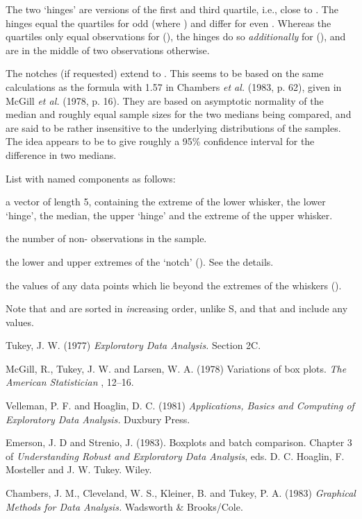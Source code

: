 %
\begin{Details}\relax
The two `hinges' are versions of the first and third quartile,
i.e., close to .  The hinges equal
the quartiles for odd  (where ) and
differ for even .  Whereas the quartiles only equal observations
for  (),
the hinges do so \emph{additionally} for 
(), and are in the middle of
two observations otherwise.

The notches (if requested) extend to .
This seems to be based on the same calculations as the formula with 1.57 in
Chambers \emph{et al.} (1983, p. 62), given in McGill \emph{et al.}
(1978, p. 16).  They are based on asymptotic normality of the median
and roughly equal sample sizes for the two medians being compared, and
are said to be rather insensitive to the underlying distributions of
the samples.  The idea appears to be to give roughly a 95\% confidence
interval for the difference in two medians.
\end{Details}
%
\begin{Value}
List with named components as follows:
\begin{ldescription}
\item[\code{stats}] a vector of length 5, containing the extreme of the
lower whisker, the lower `hinge', the median, the upper
`hinge' and the extreme of the upper whisker.
\item[\code{n}] the number of non- observations in the sample.
\item[\code{conf}] the lower and upper extremes of the `notch'
(). See the details.
\item[\code{out}] the values of any data points which lie beyond the
extremes of the whiskers ().

\end{ldescription}
Note that  and  are sorted in \emph{in}creasing
order, unlike S, and that  and  include any
 values.
\end{Value}
%
\begin{References}\relax
Tukey, J. W. (1977) \emph{Exploratory Data Analysis.} Section 2C.

McGill, R., Tukey, J. W. and Larsen, W. A. (1978) Variations of box
plots. \emph{The American Statistician} , 12--16.

Velleman, P. F. and Hoaglin, D. C. (1981) \emph{Applications, Basics
and Computing of Exploratory Data Analysis.}  Duxbury Press.

Emerson, J. D and Strenio, J. (1983). Boxplots and batch comparison.
Chapter 3 of \emph{Understanding Robust and Exploratory Data
Analysis}, eds. D. C. Hoaglin, F. Mosteller and J. W. Tukey.  Wiley.

Chambers, J. M., Cleveland, W. S., Kleiner, B. and Tukey, P. A. (1983)
\emph{Graphical Methods for Data Analysis.}  Wadsworth \& Brooks/Cole.
\end{References}
